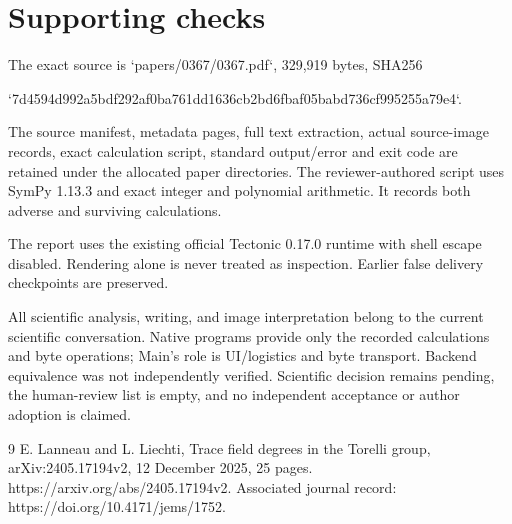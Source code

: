 \documentclass[10pt]{article}
\begin{document}
\section*{Supporting checks}
The exact source is `papers/0367/0367.pdf`, 329,919 bytes, SHA256\par
`7d4594d992a5bdf292af0ba761dd1636cb2bd6fbaf05babd736cf995255a79e4`.\par
The source manifest, metadata pages, full text extraction, actual source-image records, exact calculation script, standard output/error and exit code are retained under the allocated paper directories. The reviewer-authored script uses SymPy 1.13.3 and exact integer and polynomial arithmetic. It records both adverse and surviving calculations.\par
The report uses the existing official Tectonic 0.17.0 runtime with shell escape disabled. Rendering alone is never treated as inspection. Earlier false delivery checkpoints are preserved.\par
All scientific analysis, writing, and image interpretation belong to the current scientific conversation. Native programs provide only the recorded calculations and byte operations; Main’s role is UI/logistics and byte transport. Backend equivalence was not independently verified. Scientific decision remains pending, the human-review list is empty, and no independent acceptance or author adoption is claimed.\par
9 E. Lanneau and L. Liechti, Trace field degrees in the Torelli group, arXiv:2405.17194v2, 12 December 2025, 25 pages. https://arxiv.org/abs/2405.17194v2. Associated journal record: https://doi.org/10.4171/jems/1752.\par
\end{document}
